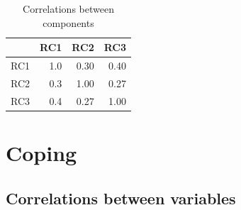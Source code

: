 \documentclass[]{article}
\begin{document}
\begin{table}[H]

\caption{\label{tab:unnamed-chunk-16}Correlations between components}
\centering
\fontsize{6}{8}\selectfont
\begin{tabular}[t]{lrrr}
\toprule
  & RC1 & RC2 & RC3\\
\midrule
RC1 & 1.0 & 0.30 & 0.40\\
RC2 & 0.3 & 1.00 & 0.27\\
RC3 & 0.4 & 0.27 & 1.00\\
\bottomrule
\end{tabular}
\end{table}

\newpage

\hypertarget{coping}{%
\section{Coping}\label{coping}}

\hypertarget{correlations-between-variables-3}{%
\subsection{Correlations between
variables}\label{correlations-between-variables-3}}
\end{document}
